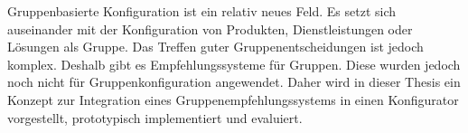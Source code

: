\Abstract

Gruppenbasierte Konfiguration ist ein relativ neues Feld. Es setzt sich auseinander mit der Konfiguration von Produkten, Dienstleistungen oder Lösungen als Gruppe. Das Treffen guter Gruppenentscheidungen ist jedoch komplex. Deshalb gibt es Empfehlungssysteme für Gruppen. Diese wurden jedoch noch nicht für Gruppenkonfiguration angewendet. Daher wird in dieser Thesis ein Konzept zur Integration eines Gruppenempfehlungssystems in einen Konfigurator vorgestellt, prototypisch implementiert und evaluiert.